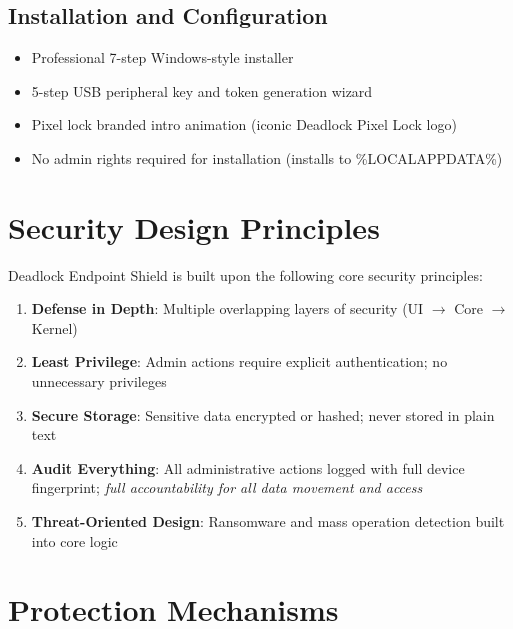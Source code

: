 \documentclass[12pt,letterpaper]{report}
\begin{document}
\section{Installation and Configuration}
\begin{itemize}
    \item Professional 7-step Windows-style installer
    \item 5-step USB peripheral key and token generation wizard
    \item Pixel lock branded intro animation (iconic Deadlock Pixel Lock logo)
    \item No admin rights required for installation (installs to \%LOCALAPPDATA\%)
\end{itemize}

\chapter{Security Design Principles}
Deadlock Endpoint Shield is built upon the following core security principles:
\begin{enumerate}
    \item \textbf{Defense in Depth}: Multiple overlapping layers of security (UI $\rightarrow$ Core $\rightarrow$ Kernel)
    \item \textbf{Least Privilege}: Admin actions require explicit authentication; no unnecessary privileges
    \item \textbf{Secure Storage}: Sensitive data encrypted or hashed; never stored in plain text
    \item \textbf{Audit Everything}: All administrative actions logged with full device fingerprint; \textit{full accountability for all data movement and access}
    \item \textbf{Threat-Oriented Design}: Ransomware and mass operation detection built into core logic
\end{enumerate}

\chapter{Protection Mechanisms}
\end{document}
